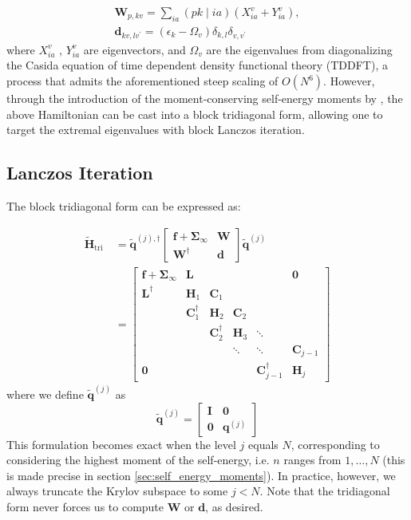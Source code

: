\documentclass[12pt]{article} %
\begin{document}
\begin{gather}
\mathbf{W}_{p, k v}=\sum_{i a}(p k \mid i a)\left(X_{i a}^{v}+Y_{i a}^{v}\right),  \\
\mathbf{d}_{k v, l v^{\prime}}=\left(\epsilon_{k}-\Omega_{v}\right) \delta_{k, l} \delta_{v, v^{\prime}}
\end{gather}
where $X_{ia}^v$ , $Y_{ia}^v$ are eigenvectors, and $\Omega _v$ are the eigenvalues from diagonalizing the Casida equation of time dependent density functional theory (TDDFT), a process that admits the aforementioned steep scaling of $O(N^6)$. However, through the introduction of the moment-conserving self-energy moments by \citet{backhouse2023dynamics}, the above Hamiltonian can be cast into a block tridiagonal form, allowing one to target the extremal eigenvalues with block Lanczos iteration.
\subsection{Lanczos Iteration}
The block tridiagonal form can be expressed as:

\begin{align}
\tilde{\mathbf{H}}_{\text {tri }} & =\tilde{\mathbf{q}}^{(j),\dagger}\left[\begin{array}{cc}
\mathbf{f}+\boldsymbol{\Sigma}_{\infty} & \mathbf{W} \\
\mathbf{W}^{\dagger} & \mathbf{d}
\end{array}\right] \tilde{\mathbf{q}}^{(j)} \\
& =\left[\begin{array}{cccccc}
\mathbf{f}+\boldsymbol{\Sigma}_{\infty} & \mathbf{L} & & & & \mathbf{0} \\
\mathbf{L}^{\dagger} & \mathbf{H}_{1} & \mathbf{C}_{1} & & & \\
& \mathbf{C}_{1}^{\dagger} & \mathbf{H}_{2} & \mathbf{C}_{2} & & \\
& & \mathbf{C}_{2}^{\dagger} & \mathbf{H}_{3} & \ddots & \\
& & & \ddots & \ddots & \mathbf{C}_{j-1} \\
\mathbf{0} & & & & \mathbf{C}_{j-1}^{\dagger} & \mathbf{H}_{j}
\end{array}\right]
\label{eq:tridiagonal}
\end{align}
where we define $\tilde{\mathbf{q}}^{(j)}$ as
\begin{equation}
    \tilde{\mathbf{q}}^{(j)}=\left[\begin{array}{cc}
\mathbf{I} & \mathbf{0} \\
\mathbf{0} & \mathbf{q}^{(j)}
\end{array}\right]
\end{equation}
This formulation becomes exact when the level $j$ equals $N$, corresponding to considering the highest moment of the self-energy, i.e. $n$ ranges from $1,\ldots,N$ (this is made precise in section \ref{sec:self_energy_moments}). In practice, however, we always truncate the Krylov subspace to some $j<N$. Note that the tridiagonal form never forces us to compute $\mathbf{W}$ or $\mathbf{d}$, as desired.
\end{document}
